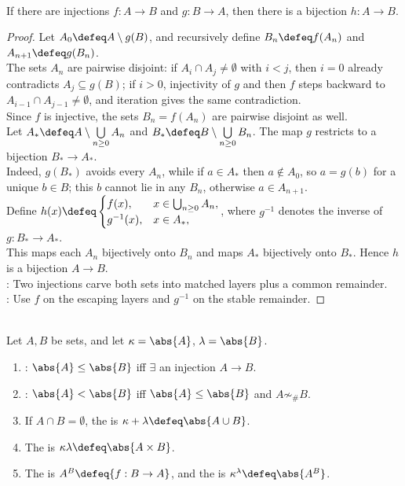 \begin{theorem} \label{thm:schroeder-bernstein} \\
If there are injections $f:A\to B$ and $g:B\to A$, then there is a bijection $h:A\to B$.
\begin{proof}
Let $A_0\defeq A\setminus g(B)$, and recursively define $B_n\defeq f(A_n)$ and $A_{n+1}\defeq g(B_n)$.\\
The sets $A_n$ are pairwise disjoint: if $A_i\cap A_j\neq\emptyset$ with $i<j$, then $i=0$ already contradicts $A_j\subseteq g(B)$; if $i>0$, injectivity of $g$ and then $f$ steps backward to $A_{i-1}\cap A_{j-1}\neq\emptyset$, and iteration gives the same contradiction.\\
Since $f$ is injective, the sets $B_n=f(A_n)$ are pairwise disjoint as well.\\
Let $A_*\defeq A\setminus\bigcup\limits_{n\geq0}A_n$ and $B_*\defeq B\setminus\bigcup\limits_{n\geq0}B_n$. The map $g$ restricts to a bijection $B_*\to A_*$.\\
Indeed, $g(B_*)$ avoids every $A_n$, while if $a\in A_*$ then $a\notin A_0$, so $a=g(b)$ for a unique $b\in B$; this $b$ cannot lie in any $B_n$, otherwise $a\in A_{n+1}$.\\
Define $h(x)\defeq
\begin{cases}
f(x), & x\in\bigcup_{n\geq0}A_n,\\
g^{-1}(x), & x\in A_*,
\end{cases}$, where $g^{-1}$ denotes the inverse of $g:B_*\to A_*$.\\
This maps each $A_n$ bijectively onto $B_n$ and maps $A_*$ bijectively onto $B_*$. Hence $h$ is a bijection $A\to B$.\\
: Two injections carve both sets into matched layers plus a common remainder.\\
: Use $f$ on the escaping layers and $g^{-1}$ on the stable remainder.
\end{proof}
\end{theorem}

\begin{definition} \label{def:cardinal-comparison-and-arithmetic} \\
Let $A,B$ be sets, and let $\kappa=\abs{A}$, $\lambda=\abs{B}$.
\begin{enumerate}[label=(\roman*)]
\setlength{\itemsep}{0pt}
\item {}: $\abs{A}\leq\abs{B}$ iff $\exists$ an injection $A\to B$.
\item {}: $\abs{A}<\abs{B}$ iff $\abs{A}\leq\abs{B}$ and $A\not\sim_{\#}B$.
\item If $A\cap B=\emptyset$, the  is $\kappa+\lambda\defeq\abs{A\cup B}$.
\item The  is $\kappa\lambda\defeq\abs{A\times B}$.
\item The  is $A^B\defeq\{f:B\to A\}$, and the  is $\kappa^\lambda\defeq\abs{A^B}$.
\end{enumerate}
\end{definition}

